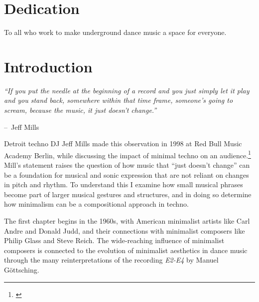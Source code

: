 \documentclass[12pt,twoside]{reedthesis}
\makeatletter
\newenvironment{chapquote}[2][2em]
  {\setlength{\@tempdima}{#1}%
   \def\chapquote@author{#2}%
   \parshape 1 \@tempdima \dimexpr\textwidth-2\@tempdima\relax%
   \itshape}
  {\par\normalfont\hfill--\ \chapquote@author\hspace*{\@tempdima}\par\bigskip}
\makeatother
\begin{document}
	\chapter*{Dedication}
To all who work to make underground dance music a space for everyone.

  \mainmatter %
  \pagestyle{fancyplain} %


    \chapter*{Introduction}
	
\onehalfspacing

\begin{chapquote}{Jeff Mills}
``If you put the needle at the beginning of a record and you just simply let it play and you stand back, somewhere within that time frame, someone’s going to scream, because the music, it just doesn’t change.''
\end{chapquote}

Detroit techno DJ Jeff Mills made this observation in 1998 at Red Bull Music Academy Berlin, while discussing the impact of minimal techno on an audience.\footnote{\cite{schmidtJeffMillsLecture1998a}} Mill's statement raises the question of how music that ``just doesn't change'' can be a foundation for musical and sonic expression that are not reliant on changes in pitch and rhythm. To understand this I examine how small musical phrases become part of larger musical gestures and structures, and in doing so determine how minimalism can be a compositional approach in techno.

The first chapter begins in the 1960s, with American minimalist artists like Carl Andre and Donald Judd, and their connections with minimalist composers like Philip Glass and Steve Reich. The wide-reaching influence of minimalist composers is connected to the evolution of minimalist aesthetics in dance music through the many reinterpretations of the recording \emph{E2-E4} by Manuel G{\"o}ttsching.
\end{document}
